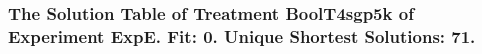  \begin{frame}
 \fontsize{8pt}{9pt}\selectfont
 \frametitle{ The Solution Table of Treatment BoolT4sgp5k of Experiment ExpE. Fit: 0. Unique Shortest Solutions: 71. }

 \label{ExpESolutionTable003.tex}  
 \end{frame}

